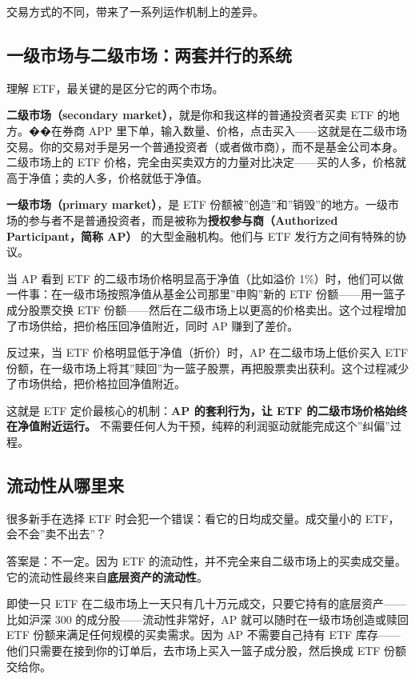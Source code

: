 \documentclass[a4paper,11pt,oneside,fontset=none,UTF8,zihao=-4]{ctexbook}
\begin{document}
交易方式的不同，带来了一系列运作机制上的差异。

\subsection{一级市场与二级市场：两套并行的系统}\label{ux4e00ux7ea7ux5e02ux573aux4e0eux4e8cux7ea7ux5e02ux573aux4e24ux5957ux5e76ux884cux7684ux7cfbux7edf}

理解 ETF，最关键的是区分它的两个市场。

\textbf{二级市场（secondary market）}，就是你和我这样的普通投资者买卖
ETF 的地方。��在券商 APP
里下单，输入数量、价格，点击买入------这就是在二级市场交易。你的交易对手是另一个普通投资者（或者做市商），而不是基金公司本身。二级市场上的
ETF
价格，完全由买卖双方的力量对比决定------买的人多，价格就高于净值；卖的人多，价格就低于净值。

\textbf{一级市场（primary market）}，是 ETF
份额被''创造''和''销毁''的地方。一级市场的参与者不是普通投资者，而是被称为\textbf{授权参与商（Authorized
Participant，简称 AP）} 的大型金融机构。他们与 ETF
发行方之间有特殊的协议。

当 AP 看到 ETF 的二级市场价格明显高于净值（比如溢价
1\%）时，他们可以做一件事：在一级市场按照净值从基金公司那里''申购''新的
ETF 份额------用一篮子成分股票交换 ETF
份额------然后在二级市场上以更高的价格卖出。这个过程增加了市场供给，把价格压回净值附近，同时
AP 赚到了差价。

反过来，当 ETF 价格明显低于净值（折价）时，AP 在二级市场上低价买入 ETF
份额，在一级市场上将其''赎回''为一篮子股票，再把股票卖出获利。这个过程减少了市场供给，把价格拉回净值附近。

这就是 ETF 定价最核心的机制：\textbf{AP 的套利行为，让 ETF
的二级市场价格始终在净值附近运行。}
不需要任何人为干预，纯粹的利润驱动就能完成这个''纠偏''过程。

\subsection{流动性从哪里来}\label{ux6d41ux52a8ux6027ux4eceux54eaux91ccux6765}

很多新手在选择 ETF 时会犯一个错误：看它的日均成交量。成交量小的
ETF，会不会''卖不出去''？

答案是：不一定。因为 ETF
的流动性，并不完全来自二级市场上的买卖成交量。它的流动性最终来自\textbf{底层资产的流动性}。

即使一只 ETF
在二级市场上一天只有几十万元成交，只要它持有的底层资产------比如沪深 300
的成分股------流动性非常好，AP 就可以随时在一级市场创造或赎回 ETF
份额来满足任何规模的买卖需求。因为 AP 不需要自己持有 ETF
库存------他们只需要在接到你的订单后，去市场上买入一篮子成分股，然后换成
ETF 份额交给你。
\end{document}
